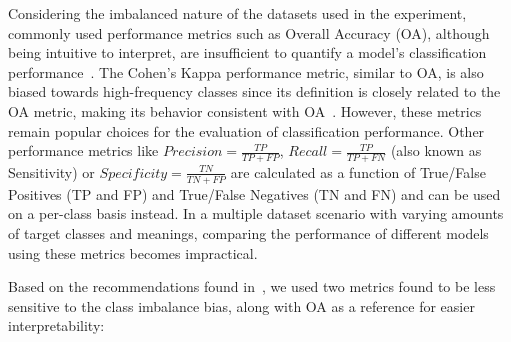 Considering the imbalanced nature of the datasets used in the experiment,
commonly used performance metrics such as Overall Accuracy (OA), although
being intuitive to interpret, are insufficient to quantify a model's
classification performance~\cite{Jeni2013}. The Cohen's Kappa performance
metric, similar to OA, is also biased towards high-frequency classes since its
definition is closely related to the OA metric, making its behavior consistent
with OA~\cite{Fatourechi2008}. However, these metrics remain popular choices
for the evaluation of classification performance. Other performance metrics
like $Precision = \frac{TP}{TP+FP}$, $Recall = \frac{TP}{TP+FN}$ (also
known as Sensitivity) or $Specificity = \frac{TN}{TN + FP}$ are calculated as
a function of True/False Positives (TP and FP) and True/False Negatives (TN
and FN) and can be used on a per-class basis instead. In a multiple dataset
scenario with varying amounts of target classes and meanings, comparing the
performance of different models using these metrics becomes impractical.
 
Based on the recommendations found in~\cite{Jeni2013, Kubat1997}, we used two
metrics found to be less sensitive to the class imbalance bias, along with OA
as a reference for easier interpretability:

